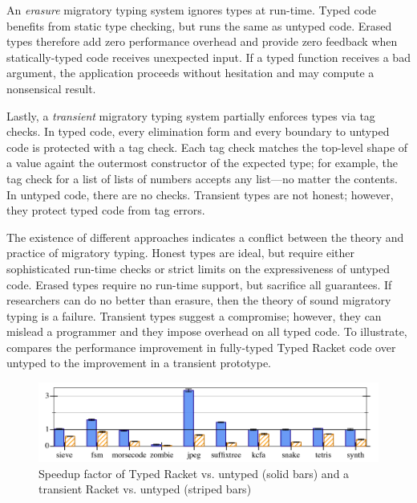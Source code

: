 An \emph{erasure}\/ migratory typing system ignores types at run-time.
Typed code benefits from static type checking, but runs the same as untyped code.
Erased types therefore add zero performance overhead and provide zero feedback
 when statically-typed code receives unexpected input.
If a typed function receives a bad argument, the application proceeds without
 hesitation and may compute a nonsensical result.

Lastly, a \emph{transient}\/ migratory typing system partially enforces types
 via tag checks.
In typed code, every elimination form and every boundary to untyped code
 is protected with a tag check.
Each tag check matches the top-level shape of a value againt the outermost
 constructor of the expected type; for example, the tag check for a
 list of lists of numbers accepts any list---no matter the contents.
In untyped code, there are no checks.
Transient types are not honest; however, they protect typed code from tag
 errors.

The existence of different approaches indicates a conflict between the theory
 and practice of migratory typing.
Honest types are ideal, but require either sophisticated run-time checks
 or strict limits on the expressiveness of untyped code.
Erased types require no run-time support, but sacrifice all
 guarantees.
If researchers can do no better than erasure, then the theory of
 sound migratory typing is a failure.
Transient types suggest a compromise; however, they can mislead a programmer
 and they impose overhead on all typed code.
To illustrate,  compares the performance improvement
 in fully-typed Typed Racket code over untyped to the improvement in a
 transient prototype.

\begin{figure}[h]
  \includegraphics[width=0.8\columnwidth]{src/icfp-bars.png}
  \caption{Speedup factor of Typed Racket vs. untyped (solid bars) and a transient Racket vs. untyped (striped bars)~\cite{gf-icfp-2018}}
  \label{fig:icfp-bars}
\end{figure}

 
